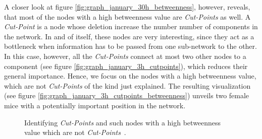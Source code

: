 A closer look at figure \ref{fig:graph_january_30h_betweenness}, however, reveals, that most of the nodes with a high betweenness value are \textit{Cut-Points} as well. A \textit{Cut-Point} is a node whose deletion increase the number number of components in the network\citep{pajek:03}. In and of itself, these nodes are very interesting, since they act as a bottleneck when information has to be passed from one sub-network to the other. In this case, however, all the \textit{Cut-Points} connect at most two other nodes to a component (see figure \ref{fig:graph_january_3h_cutpoints}), which reduces their general importance. Hence, we focus on the nodes with a high betweenness value, which are not \textit{Cut-Points} of the kind just explained. The resulting visualization (see figure \ref{fig:graph_january_3h_cutpoints_betweenness}) unveils two female mice with a potentially important position in the network. 

\begin{figure}[htpb]%
	\centering 
	\qquad
  	
  	\caption[Network visualization of \textit{Cut-Points} and such with a high betweenness value which are not \textit{Cut-Points}]{Identifying \textit{Cut-Points}  and such nodes with a high betweenness value which are not \textit{Cut-Points}~.}
  	
\end{figure}



